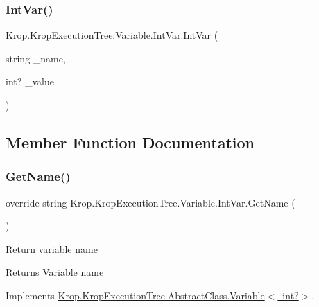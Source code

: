 \subsubsection{\texorpdfstring{Int\+Var()}{IntVar()}}
{\footnotesize\ttfamily Krop.\+Krop\+Execution\+Tree.\+Variable.\+Int\+Var.\+Int\+Var (\begin{DoxyParamCaption}\item[{string}]{\+\_\+name,  }\item[{int?}]{\+\_\+value }\end{DoxyParamCaption})}



\subsection{Member Function Documentation}
\mbox{\label{class_krop_1_1_krop_execution_tree_1_1_variable_1_1_int_var_ae48d754976bd6ed849a048ae209a689a}} 
\subsubsection{\texorpdfstring{Get\+Name()}{GetName()}}
{\footnotesize\ttfamily override string Krop.\+Krop\+Execution\+Tree.\+Variable.\+Int\+Var.\+Get\+Name (\begin{DoxyParamCaption}{ }\end{DoxyParamCaption})\hspace{0.3cm}{\ttfamily [virtual]}}



Return variable name 

\begin{DoxyReturn}{Returns}
\mbox{\hyperlink{namespace_krop_1_1_krop_execution_tree_1_1_variable}{Variable}} name
\end{DoxyReturn}


Implements \mbox{\hyperlink{class_krop_1_1_krop_execution_tree_1_1_abstract_class_1_1_variable_a987550c24ebd0ceb01aec0b6edf51dfb}{Krop.\+Krop\+Execution\+Tree.\+Abstract\+Class.\+Variable$<$ int?$>$}}.

\mbox{\label{class_krop_1_1_krop_execution_tree_1_1_variable_1_1_int_var_a286e20f12bf8a03b9586596253a97144}} 

